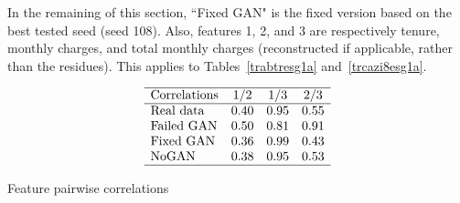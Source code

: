 \documentclass[oneside,10pt]{book}
\renewcommand{\arraystretch}{1.4} %
\begin{document}
\begin{table}[H]
\small
\begin{center}
\caption{\label{ccpufd2po} Quality \texttt{g\_dist} of synthetization, depending on model and epoch number}
\end{center}
\end{table}



In the remaining of this section, ``Fixed GAN" is the fixed version based on the best tested seed (seed 108). Also, features 1, 2, and 3
 are respectively tenure, monthly charges, and total monthly charges (reconstructed if applicable, rather than the residues). This applies to Tables~\ref{trabtresg1a} and~\ref{trcazi8esg1a}.



\begin{table}[H]
\small
\[
\begin{array}{lccc}
\hline
\text{Correlations}	&  1/2 & 1/3 & 2/3\\
\hline
 \text{Real data} &  0.40 &  0.95 & 0.55 \\
\text{Failed GAN} &  0.50 &  0.81 & 0.91 \\
\text{Fixed GAN} &  0.36 &  0.99 & 0.43 \\
\text{NoGAN} &  0.38 &  0.95 & 0.53 \\
\hline
\end{array}
\]
\caption{\label{trabtresg1a} Feature pairwise correlations}
\end{table}
\end{document}
